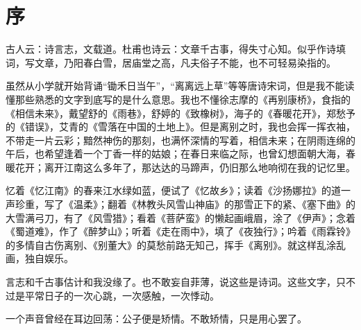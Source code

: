 \chapter{序}

古人云：诗言志，文载道。杜甫也诗云：文章千古事，得失寸心知。似乎作诗填词，写文章，乃阳春白雪，居庙堂之高，凡夫俗子不能，也不可轻易染指的。

虽然从小学就开始背诵“锄禾日当午”，“离离远上草”等等唐诗宋词，但是我不能读懂那些熟悉的文字到底写的是什么意思。我也不懂徐志摩的《再别康桥》，食指的《相信未来》，戴望舒的《雨巷》，舒婷的《致橡树》，海子的《春暖花开》，郑愁予的《错误》，艾青的《雪落在中国的土地上》。但是离别之时，我也会挥一挥衣袖，不带走一片云彩；黯然神伤的那刻，也满怀深情的写着，相信未来；在阴雨连绵的午后，也希望逢着一个丁香一样的姑娘；在春日来临之际，也曾幻想面朝大海，春暖花开；离开江南这么多年了，那达达的马蹄声，仍旧那么地响彻在我的记忆里。

忆着《忆江南》的春来江水绿如蓝，便试了《忆故乡》；读着《沙扬娜拉》的道一声珍重，写了《温柔》；翻着《林教头风雪山神庙》的那雪正下的紧、《塞下曲》的大雪满弓刀，有了《风雪猎》；看着《菩萨蛮》的懒起画峨眉，涂了《伊声》；念着《蜀道难》，作了《醉梦山》；听着《走在雨中》，填了《夜独行》；吟着《雨霖铃》的多情自古伤离别、《别董大》的莫愁前路无知己，挥手《离别》。就这样乱涂乱画，独自娱乐。

言志和千古事估计和我没缘了。也不敢妄自菲薄，说这些是诗词。这些文字，只不过是平常日子的一次心跳，一次感触，一次悸动。

一个声音曾经在耳边回荡：公子便是矫情。不敢矫情，只是用心罢了。
